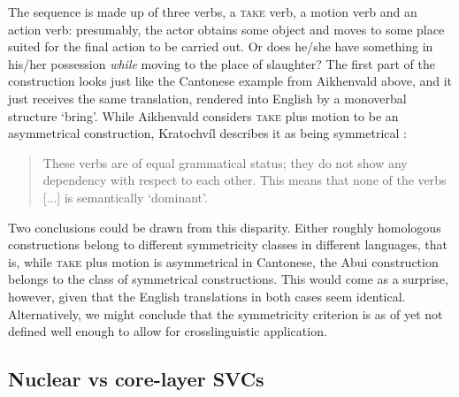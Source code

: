 The sequence is made up of three verbs, a \textsc{take} verb, a motion verb and an action verb: presumably, the actor obtains some object and moves to some place suited for the final action to be carried out. Or does he/she have something in his/her possession \textit{while} moving to the place of slaughter? The first part of the construction looks just like the Cantonese example from Aikhenvald above, and it just receives the same translation, rendered into English by a monoverbal structure `bring'. While Aikhenvald considers \textsc{take} plus motion to be an asymmetrical construction, Kratochvíl describes it as being symmetrical \citep[351]{kratochvil2007grammar}:

\begin{quote}These verbs are of equal grammatical status; they do not show any dependency with respect to each other. This means that none of the verbs [...] is semantically `dominant'.\end{quote}

Two conclusions could be drawn from this disparity. Either roughly homologous constructions belong to different symmetricity classes in different languages, that is, while \textsc{take} plus motion is asymmetrical in Cantonese, the Abui construction belongs to the class of symmetrical constructions. This would come as a surprise, however, given that the English translations in both cases seem identical. Alternatively, we might conclude that the symmetricity criterion is as of yet not defined well enough to allow for crosslinguistic application. 

\subsection{Nuclear vs core-layer SVCs}\label{sec:nuclear}

